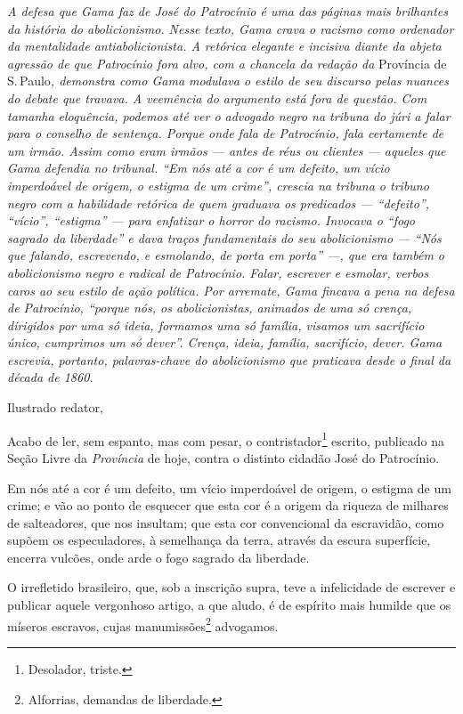 \begin{resumo}
\emph{A defesa que Gama faz de José do Patrocínio é uma das páginas mais
brilhantes da história do abolicionismo. Nesse texto, Gama crava o
racismo como ordenador da mentalidade antiabolicionista. A retórica
elegante e incisiva diante da abjeta agressão de que Patrocínio fora
alvo, com a chancela da redação da} Província de S.\,Paulo\emph{,
demonstra como Gama modulava o estilo de seu discurso pelas nuances do
debate que travava. A veemência do argumento está fora de questão. Com
tamanha eloquência, podemos até ver o advogado negro na tribuna do
júri a falar para o conselho de sentença. Porque onde fala de
Patrocínio, fala certamente de um irmão. Assim como eram irmãos --- antes
de réus ou clientes --- aqueles que Gama defendia no tribunal. ``Em nós
até a cor é um defeito, um vício imperdoável de origem, o estigma de um
crime'', crescia na tribuna o tribuno negro com a habilidade retórica de
quem graduava os predicados --- ``defeito'', ``vício'', ``estigma'' --- para
enfatizar o horror do racismo. Invocava o ``fogo sagrado da liberdade'' e
dava traços fundamentais do seu abolicionismo --- ``Nós que falando,
escrevendo, e esmolando, de porta em porta'' ---, que era também o
abolicionismo negro e radical de Patrocínio. Falar, escrever e esmolar,
verbos caros ao seu estilo de ação política. Por arremate, Gama fincava
a pena na defesa de Patrocínio, ``porque nós, os abolicionistas, animados
de uma só crença, dirigidos por uma só ideia, formamos uma só família,
visamos um sacrifício único, cumprimos um só dever''. Crença, ideia,
família, sacrifício, dever. Gama escrevia, portanto, palavras-chave do
abolicionismo que praticava desde o final da década de 1860. }
\end{resumo}

Ilustrado redator,

Acabo de ler, sem espanto, mas com pesar, o contristador\footnote{
  Desolador, triste.} escrito, publicado na Seção Livre da
\emph{Província} de hoje, contra o distinto cidadão José do Patrocínio.

Em nós até a cor é um defeito, um vício imperdoável de origem, o estigma
de um crime; e vão ao ponto de esquecer que esta cor é a origem da
riqueza de milhares de salteadores, que nos insultam; que esta cor
convencional da escravidão, como supõem os especuladores, à semelhança
da terra, através da escura superfície, encerra vulcões, onde arde o
fogo sagrado da liberdade.

O irrefletido brasileiro, que, sob a inscrição supra, teve a
infelicidade de escrever e publicar aquele vergonhoso artigo, a que
aludo, é de espírito mais humilde que os míseros escravos, cujas
manumissões\footnote{Alforrias, demandas de liberdade.} advogamos.

